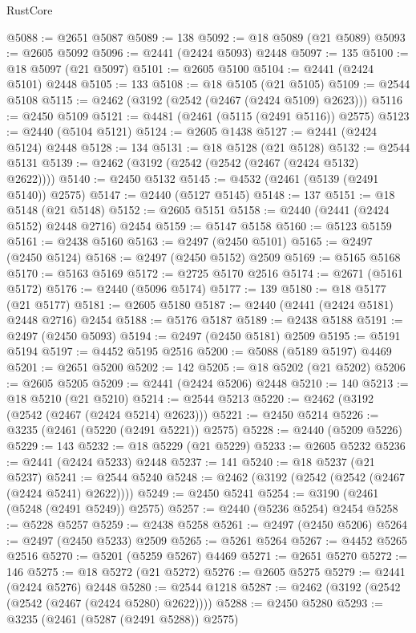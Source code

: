 \begin{lexlean}{RustCore}
\begin{coremodule}
@5088 := @2651 @5087
@5089 := 138
@5092 := @18 @5089 (@21 @5089)
@5093 := @2605 @5092
@5096 := @2441 (@2424 @5093) @2448
@5097 := 135
@5100 := @18 @5097 (@21 @5097)
@5101 := @2605 @5100
@5104 := @2441 (@2424 @5101) @2448
@5105 := 133
@5108 := @18 @5105 (@21 @5105)
@5109 := @2544 @5108
@5115 := @2462 (@3192 (@2542 (@2467 (@2424 @5109) @2623)))
@5116 := @2450 @5109
@5121 := @4481 (@2461 (@5115 (@2491 @5116)) @2575)
@5123 := @2440 (@5104 @5121)
@5124 := @2605 @1438
@5127 := @2441 (@2424 @5124) @2448
@5128 := 134
@5131 := @18 @5128 (@21 @5128)
@5132 := @2544 @5131
@5139 := @2462 (@3192 (@2542 (@2542 (@2467 (@2424 @5132) @2622))))
@5140 := @2450 @5132
@5145 := @4532 (@2461 (@5139 (@2491 @5140)) @2575)
@5147 := @2440 (@5127 @5145)
@5148 := 137
@5151 := @18 @5148 (@21 @5148)
@5152 := @2605 @5151
@5158 := @2440 (@2441 (@2424 @5152) @2448 @2716) @2454
@5159 := @5147 @5158
@5160 := @5123 @5159
@5161 := @2438 @5160
@5163 := @2497 (@2450 @5101)
@5165 := @2497 (@2450 @5124)
@5168 := @2497 (@2450 @5152) @2509
@5169 := @5165 @5168
@5170 := @5163 @5169
@5172 := @2725 @5170 @2516
@5174 := @2671 (@5161 @5172)
@5176 := @2440 (@5096 @5174)
@5177 := 139
@5180 := @18 @5177 (@21 @5177)
@5181 := @2605 @5180
@5187 := @2440 (@2441 (@2424 @5181) @2448 @2716) @2454
@5188 := @5176 @5187
@5189 := @2438 @5188
@5191 := @2497 (@2450 @5093)
@5194 := @2497 (@2450 @5181) @2509
@5195 := @5191 @5194
@5197 := @4452 @5195 @2516
@5200 := @5088 (@5189 @5197) @4469
@5201 := @2651 @5200
@5202 := 142
@5205 := @18 @5202 (@21 @5202)
@5206 := @2605 @5205
@5209 := @2441 (@2424 @5206) @2448
@5210 := 140
@5213 := @18 @5210 (@21 @5210)
@5214 := @2544 @5213
@5220 := @2462 (@3192 (@2542 (@2467 (@2424 @5214) @2623)))
@5221 := @2450 @5214
@5226 := @3235 (@2461 (@5220 (@2491 @5221)) @2575)
@5228 := @2440 (@5209 @5226)
@5229 := 143
@5232 := @18 @5229 (@21 @5229)
@5233 := @2605 @5232
@5236 := @2441 (@2424 @5233) @2448
@5237 := 141
@5240 := @18 @5237 (@21 @5237)
@5241 := @2544 @5240
@5248 := @2462 (@3192 (@2542 (@2542 (@2467 (@2424 @5241) @2622))))
@5249 := @2450 @5241
@5254 := @3190 (@2461 (@5248 (@2491 @5249)) @2575)
@5257 := @2440 (@5236 @5254) @2454
@5258 := @5228 @5257
@5259 := @2438 @5258
@5261 := @2497 (@2450 @5206)
@5264 := @2497 (@2450 @5233) @2509
@5265 := @5261 @5264
@5267 := @4452 @5265 @2516
@5270 := @5201 (@5259 @5267) @4469
@5271 := @2651 @5270
@5272 := 146
@5275 := @18 @5272 (@21 @5272)
@5276 := @2605 @5275
@5279 := @2441 (@2424 @5276) @2448
@5280 := @2544 @1218
@5287 := @2462 (@3192 (@2542 (@2542 (@2467 (@2424 @5280) @2622))))
@5288 := @2450 @5280
@5293 := @3235 (@2461 (@5287 (@2491 @5288)) @2575)

\end{coremodule}
\end{lexlean}

